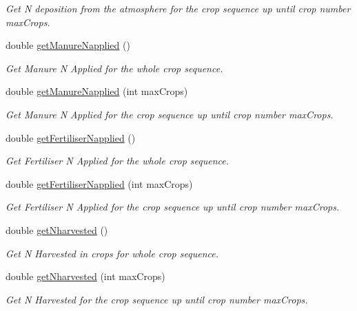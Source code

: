 \begin{DoxyCompactItemize}
\begin{DoxyCompactList}\small\item\em Get N deposition from the atmosphere for the crop sequence up until crop number max\+Crops. \end{DoxyCompactList}\item 
double \mbox{\hyperlink{class_crop_sequence_class_a065a47b85cc5dafc3ebdfea18b8981f9}{get\+Manure\+Napplied}} ()
\begin{DoxyCompactList}\small\item\em Get Manure N Applied for the whole crop sequence. \end{DoxyCompactList}\item 
double \mbox{\hyperlink{class_crop_sequence_class_a7393fa642484080608936905b23c226d}{get\+Manure\+Napplied}} (int max\+Crops)
\begin{DoxyCompactList}\small\item\em Get Manure N Applied for the crop sequence up until crop number max\+Crops. \end{DoxyCompactList}\item 
double \mbox{\hyperlink{class_crop_sequence_class_af4526f8f9ffcd16aa194f11e0de87e85}{get\+Fertiliser\+Napplied}} ()
\begin{DoxyCompactList}\small\item\em Get Fertiliser N Applied for the whole crop sequence. \end{DoxyCompactList}\item 
double \mbox{\hyperlink{class_crop_sequence_class_a70461a9368b16ddaed83a1938321a02b}{get\+Fertiliser\+Napplied}} (int max\+Crops)
\begin{DoxyCompactList}\small\item\em Get Fertiliser N Applied for the crop sequence up until crop number max\+Crops. \end{DoxyCompactList}\item 
double \mbox{\hyperlink{class_crop_sequence_class_a4c9e7270b6302c4458acde8c07c378c1}{get\+Nharvested}} ()
\begin{DoxyCompactList}\small\item\em Get N Harvested in crops for whole crop sequence. \end{DoxyCompactList}\item 
double \mbox{\hyperlink{class_crop_sequence_class_a382d9bf27f83833304ded5881aeb5534}{get\+Nharvested}} (int max\+Crops)
\begin{DoxyCompactList}\small\item\em Get N Harvested for the crop sequence up until crop number max\+Crops. \end{DoxyCompactList}\item 

\end{DoxyCompactItemize}
